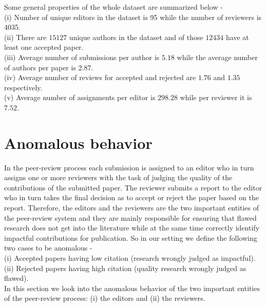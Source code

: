 Some general properties of the whole dataset are summarized below - \\
(i) Number of unique editors in the dataset is 95 while the number of reviewers is 4035.\\ 
(ii) There are $15127$ unique authors in the dataset and of those $12434$ have at least one accepted paper.\\
(iii) Average number of submissions per author is $5.18$ while the average number of authors per paper is 2.87.\\
(iv) Average number of reviews for accepted and rejected are $1.76$ and $1.35$ respectively.\\
(v) Average number of assignments per editor is $298.28$ while per reviewer it is $7.52$.\\

%
\fi

\section{Anomalous behavior}
\label{anomalies}
In the peer-review process each submission is assigned to an editor who in turn assigns one or more reviewers with the task of judging the quality of the contributions of the submitted paper. The reviewer submits a report to the editor who in turn takes the final decision as to accept or reject the paper based on the report. Therefore, the editors and the reviewers are the two important entities of the peer-review system and they are mainly responsible for ensuring that flawed research does not get into the literature while at the same time correctly identify impactful contributions for publication.  
 So in our setting we define the following two cases to be anomalous - \\
(i) Accepted papers having low citation (research wrongly judged as impactful). \\
(ii) Rejected papers having high citation (quality research wrongly judged as flawed). \\
In this section we look into the anomalous behavior of the two important entities of the peer-review process: (i) the editors and (ii) the reviewers.


